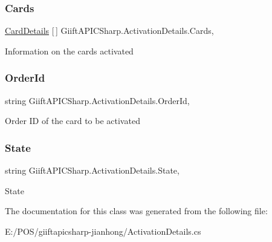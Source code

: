 \subsubsection{\texorpdfstring{Cards}{Cards}}
{\footnotesize\ttfamily \hyperlink{class_giift_a_p_i_c_sharp_1_1_card_details}{Card\+Details} \mbox{[}$\,$\mbox{]} Giift\+A\+P\+I\+C\+Sharp.\+Activation\+Details.\+Cards\hspace{0.3cm}{\ttfamily [get]}, {\ttfamily [set]}}



Information on the cards activated 

\mbox{\label{class_giift_a_p_i_c_sharp_1_1_activation_details_ac8113e10092e96a5430621c0462d3395}} 
\subsubsection{\texorpdfstring{Order\+Id}{OrderId}}
{\footnotesize\ttfamily string Giift\+A\+P\+I\+C\+Sharp.\+Activation\+Details.\+Order\+Id\hspace{0.3cm}{\ttfamily [get]}, {\ttfamily [set]}}



Order ID of the card to be activated 

\mbox{\label{class_giift_a_p_i_c_sharp_1_1_activation_details_a531e51763af8466e267f7299ab132fd5}} 
\subsubsection{\texorpdfstring{State}{State}}
{\footnotesize\ttfamily string Giift\+A\+P\+I\+C\+Sharp.\+Activation\+Details.\+State\hspace{0.3cm}{\ttfamily [get]}, {\ttfamily [set]}}



State 



The documentation for this class was generated from the following file\+:\begin{DoxyCompactItemize}
\item 
E\+:/\+P\+O\+S/giiftapicsharp-\/jianhong/Activation\+Details.\+cs\end{DoxyCompactItemize}

